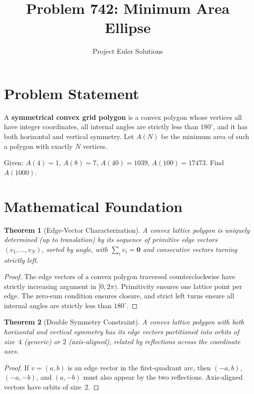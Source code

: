 \documentclass[11pt]{article}
\title{Problem 742: Minimum Area Ellipse}
\author{Project Euler Solutions}
\date{}
\newtheorem{theorem}{Theorem}
\theoremstyle{definition}
\begin{document}
\maketitle

\section{Problem Statement}

A \textbf{symmetrical convex grid polygon} is a convex polygon whose vertices all have integer coordinates, all internal angles are strictly less than $180^\circ$, and it has both horizontal and vertical symmetry. Let $A(N)$ be the minimum area of such a polygon with exactly $N$ vertices.

Given: $A(4)=1$, $A(8)=7$, $A(40)=1039$, $A(100)=17473$. Find $A(1000)$.

\section{Mathematical Foundation}

\begin{theorem}[Edge-Vector Characterization]
A convex lattice polygon is uniquely determined (up to translation) by its sequence of primitive edge vectors $(v_1, \ldots, v_N)$, sorted by angle, with $\sum_i v_i = \mathbf{0}$ and consecutive vectors turning strictly left.
\end{theorem}

\begin{proof}
The edge vectors of a convex polygon traversed counterclockwise have strictly increasing argument in $[0,2\pi)$. Primitivity ensures one lattice point per edge. The zero-sum condition ensures closure, and strict left turns ensure all internal angles are strictly less than $180^\circ$.
\end{proof}

\begin{theorem}[Double Symmetry Constraint]
A convex lattice polygon with both horizontal and vertical symmetry has its edge vectors partitioned into orbits of size~$4$ (generic) or $2$ (axis-aligned), related by reflections across the coordinate axes.
\end{theorem}

\begin{proof}
If $v = (a,b)$ is an edge vector in the first-quadrant arc, then $(-a,b)$, $(-a,-b)$, and $(a,-b)$ must also appear by the two reflections. Axis-aligned vectors have orbits of size~$2$.
\end{proof}
\end{document}
